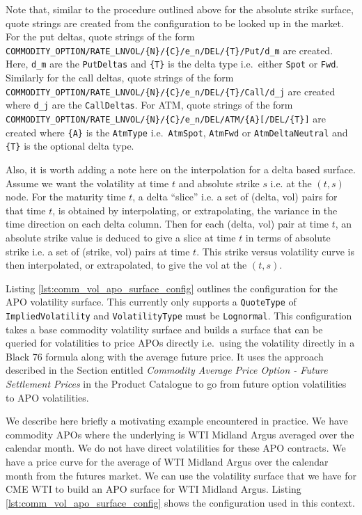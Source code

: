 Note that, similar to the procedure outlined above for the absolute strike surface, quote strings are created from the configuration to be looked up in the market. For the put deltas, quote strings of the form \lstinline!COMMODITY_OPTION/RATE_LNVOL/{N}/{C}/e_n/DEL/{T}/Put/d_m! are created. Here, \lstinline!d_m! are the \lstinline!PutDeltas! and \lstinline!{T}! is the delta type i.e.\ either \lstinline!Spot! or \lstinline!Fwd!. Similarly for the call deltas, quote strings of the form \lstinline!COMMODITY_OPTION/RATE_LNVOL/{N}/{C}/e_n/DEL/{T}/Call/d_j! are created where \lstinline!d_j! are the \lstinline!CallDeltas!. For ATM, quote strings of the form \lstinline!COMMODITY_OPTION/RATE_LNVOL/{N}/{C}/e_n/DEL/ATM/{A}[/DEL/{T}]! are created where \lstinline!{A}! is the \lstinline!AtmType! i.e.\ \lstinline!AtmSpot!, \lstinline!AtmFwd! or \lstinline!AtmDeltaNeutral! and \lstinline!{T}! is the optional delta type.

Also, it is worth adding a note here on the interpolation for a delta based surface. Assume we want the volatility at time $t$ and absolute strike $s$ i.e. at the $(t, s)$ node. For the maturity time $t$, a delta ``slice'' i.e. a set of (delta, vol) pairs for that time $t$, is obtained by interpolating, or extrapolating, the variance in the time direction on each delta column. Then for each (delta, vol) pair at time $t$, an absolute strike value is deduced to give a slice at time $t$ in terms of absolute strike i.e. a set of (strike, vol) pairs at time $t$. This strike versus volatility curve is then interpolated, or extrapolated, to give the vol at the $(t, s)$.

Listing \ref{lst:comm_vol_apo_surface_config} outlines the configuration for the APO volatility surface. This currently only supports a \lstinline!QuoteType! of \lstinline!ImpliedVolatility! and \lstinline!VolatilityType! must be \lstinline!Lognormal!. This configuration takes a base commodity volatility surface and builds a surface that can be queried for volatilities to price APOs directly i.e.\ using the volatility directly in a Black 76 formula along with the average future price. It uses the approach described in the Section entitled \textit{Commodity Average Price Option - Future Settlement Prices} in the Product Catalogue to go from future option volatilities to APO volatilities.

We describe here briefly a motivating example encountered in practice. We have commodity APOs where the underlying is WTI Midland Argus averaged over the calendar month. We do not have direct volatilities for these APO contracts. We have a price curve for the average of WTI Midland Argus over the calendar month from the futures market. We can use the volatility surface that we have for CME WTI to build an APO surface for WTI Midland Argus. Listing \ref{lst:comm_vol_apo_surface_config} shows the configuration used in this context.

